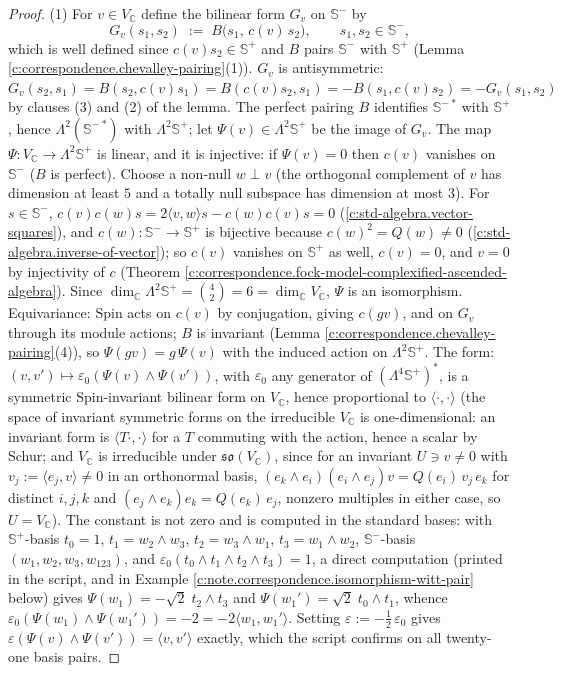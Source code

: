 \documentclass[11pt]{article}
\theoremstyle{definition}
\theoremstyle{plain}
\providecommand{\C}{}\renewcommand{\C}{\mathbb{C}}
\providecommand{\CS}{}\renewcommand{\CS}{{\mathbb{S}^{+}}}
\providecommand{\CSm}{}\renewcommand{\CSm}{{\mathbb{S}^{-}}}
\providecommand{\ip}{}\renewcommand{\ip}[2]{\langle #1, #2\rangle}
\begin{document}
\begin{proof}
(1) For $v \in V_\C$ define the bilinear form $G_v$ on $\CSm$ by
\[
G_v(s_1, s_2) \;:=\; B\bigl(s_1,\, c(v)\,s_2\bigr), \qquad s_1, s_2 \in \CSm,
\]
which is well defined since $c(v)s_2 \in \CS$ and $B$ pairs $\CSm$ with $\CS$ (Lemma \ref{c:correspondence.chevalley-pairing}(1)). $G_v$ is antisymmetric: $G_v(s_2, s_1) = B(s_2, c(v)s_1) = B(c(v)s_2, s_1) = -B(s_1, c(v)s_2) = -G_v(s_1,s_2)$ by clauses (3) and (2) of the lemma. The perfect pairing $B$ identifies $\CSm^{\,*}$ with $\CS$, hence $\Lambda^2(\CSm^{\,*})$ with $\Lambda^2\CS$; let $\Psi(v) \in \Lambda^2\CS$ be the image of $G_v$. The map $\Psi: V_\C \to \Lambda^2\CS$ is linear, and it is injective: if $\Psi(v) = 0$ then $c(v)$ vanishes on $\CSm$ ($B$ is perfect). Choose a non-null $w \perp v$ (the orthogonal complement of $v$ has dimension at least $5$ and a totally null subspace has dimension at most $3$). For $s \in \CSm$, $c(v)c(w)s = 2\ip{v}{w}s - c(w)c(v)s = 0$ (\ref{c:std-algebra.vector-squares}), and $c(w): \CSm \to \CS$ is bijective because $c(w)^2 = Q(w) \neq 0$ (\ref{c:std-algebra.inverse-of-vector}); so $c(v)$ vanishes on $\CS$ as well, $c(v) = 0$, and $v = 0$ by injectivity of $c$ (Theorem \ref{c:correspondence.fock-model-complexified-ascended-algebra}). Since $\dim_\C \Lambda^2\CS = \binom42 = 6 = \dim_\C V_\C$, $\Psi$ is an isomorphism. Equivariance: $\mathrm{Spin}$ acts on $c(v)$ by conjugation, giving $c(gv)$, and on $G_v$ through its module actions; $B$ is invariant (Lemma \ref{c:correspondence.chevalley-pairing}(4)), so $\Psi(gv) = g\,\Psi(v)$ with the induced action on $\Lambda^2\CS$. The form: $(v, v') \mapsto \varepsilon_0(\Psi(v)\wedge\Psi(v'))$, with $\varepsilon_0$ any generator of $(\Lambda^4\CS)^*$, is a symmetric $\mathrm{Spin}$-invariant bilinear form on $V_\C$, hence proportional to $\ip{\cdot}{\cdot}$ (the space of invariant symmetric forms on the irreducible $V_\C$ is one-dimensional: an invariant form is $\ip{T\cdot}{\cdot}$ for a $T$ commuting with the action, hence a scalar by Schur; and $V_\C$ is irreducible under $\mathfrak{so}(V_\C)$, since for an invariant $U \ni v \neq 0$ with $v_j := \ip{e_j}{v} \neq 0$ in an orthonormal basis, $(e_k\wedge e_i)(e_i\wedge e_j)v = Q(e_i)\,v_j\,e_k$ for distinct $i, j, k$ and $(e_j\wedge e_k)e_k = Q(e_k)\,e_j$, nonzero multiples in either case, so $U = V_\C$). The constant is not zero and is computed in the standard bases: with $\CS$-basis $t_0 = 1$, $t_1 = w_2\wedge w_3$, $t_2 = w_3 \wedge w_1$, $t_3 = w_1\wedge w_2$, $\CSm$-basis $(w_1, w_2, w_3, w_{123})$, and $\varepsilon_0(t_0\wedge t_1\wedge t_2\wedge t_3) = 1$, a direct computation (printed in the script, and in Example \ref{c:note.correspondence.isomorphism-witt-pair} below) gives $\Psi(w_1) = -\sqrt2\; t_2\wedge t_3$ and $\Psi(w_1') = \sqrt2\; t_0 \wedge t_1$, whence $\varepsilon_0(\Psi(w_1)\wedge\Psi(w_1')) = -2 = -2\ip{w_1}{w_1'}$. Setting $\varepsilon := -\tfrac12\,\varepsilon_0$ gives $\varepsilon(\Psi(v)\wedge\Psi(v')) = \ip{v}{v'}$ exactly, which the script confirms on all twenty-one basis pairs.

\end{proof}
\end{document}
